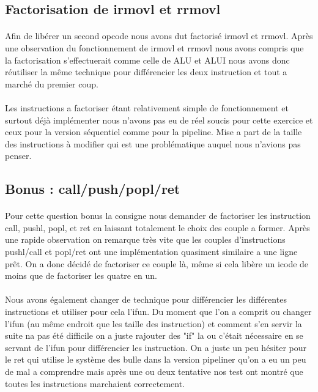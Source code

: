 \documentclass[12pt]{article}
\begin{document}
\subsection{Factorisation de irmovl et rrmovl}
\paragraph{}Afin de libérer un second opcode nous avons dut factorisé irmovl et rrmovl.
Après une observation du fonctionnement de irmovl et rrmovl nous avons compris que la factorisation s’effectuerait comme celle de ALU et ALUI nous avons donc réutiliser la même technique pour différencier les deux instruction et tout a marché du premier coup.

\paragraph{}Les instructions a factoriser étant relativement simple de fonctionnement et surtout déjà implémenter nous n'avons pas eu de réel soucis pour cette exercice et ceux pour la version séquentiel comme pour la pipeline. Mise a part de la taille des instructions à modifier qui est une problématique auquel nous n'avions pas penser.

\subsection{Bonus : call/push/popl/ret}

\paragraph{} Pour cette question bonus la consigne nous demander de factoriser les instruction call, pushl, popl, et ret en laissant totalement le choix des couple a former.
Après une rapide observation on remarque très vite que les couples d'instructions pushl/call et popl/ret ont une implémentation quasiment similaire a une ligne prêt. On a donc décidé de factoriser ce couple là, même si cela libère un icode de moins que de factoriser les quatre en un.

\paragraph{} Nous avons également changer de technique pour différencier les différentes instructions et utiliser pour cela l'ifun.
Du moment que l'on a comprit ou changer l'ifun (au même endroit que les taille des instruction) et comment s'en servir la suite na pas été difficile on a juste rajouter des "if" la ou c’était nécessaire en se servant de l'ifun pour différencier les instruction. On a juste un peu hésiter pour le ret qui utilise le système des bulle dans la version pipeliner qu'on a eu un peu de mal a comprendre mais après une ou deux tentative nos test ont montré que toutes les instructions marchaient correctement.
\end{document}
